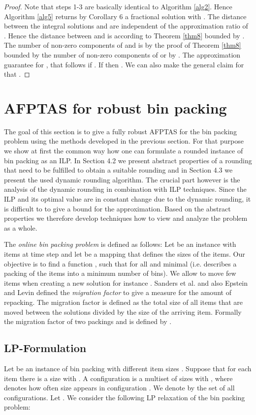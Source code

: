\documentclass[a4paper,11pt]{article}
\begin{document}
\begin{proof}
Note that steps 1-3 are basically identical to Algorithm \ref{alg2}. Hence Algorithm \ref{alg5} returns by Corollary 6 a fractional
solution  with . The distance between the integral solutions  
and  are independent of the approximation ratio of . Hence the distance between  and  is
according to Theorem \ref{thm8} bounded by . The number of non-zero components of
 and 
is by the proof of Theorem \ref{thm8} bounded by the number  of non-zero components of  or by 
.
The approximation guarantee for , that  follows if 
. If  then .
We can also make the general claim for  that .
\end{proof}

\section{AFPTAS for robust bin packing}
\label{sec:bin-packing}
The goal of this section is to give a fully robust AFPTAS for the bin packing
problem using the methods developed in the previous section. For that purpose we show at first the common way how one
can formulate a rounded instance of bin packing as an ILP. In Section 4.2 we present abstract properties
of a rounding that need to be fulfilled to obtain a suitable rounding and in Section 4.3 we present the used
dynamic rounding algorithm. The crucial part however is the analysis of the dynamic rounding in combination with ILP
techniques. Since the ILP and its optimal value are in constant change due to the dynamic rounding, it is difficult to 
to give a bound for the approximation. Based on the abstract properties we therefore develop techniques how
to view and analyze the problem as a whole. 

The \emph{online bin packing problem} is defined as follows:
Let  be an instance with  items at time step 
and let  be a mapping that defines the sizes of the items.
Our objective is to find a function , such that  for all
 and minimal  (i.e.  describes a packing of the items into a minimum number
of bins). We allow to move
few items when creating a new solution  for instance . 
Sanders et al. \cite{sanders2009} and also Epstein and Levin \cite{epstein2006robust}
defined the \emph{migration factor} to give a measure for the amount of repacking. 
The migration factor is defined as the total size of all items that are
moved between the solutions divided by the size of the arriving item.
Formally the migration factor of two packings  and  is defined by 
.
\subsection{LP-Formulation}
Let  be an instance of bin packing with  different item sizes . Suppose
that for each item  there is a size  with .
A configuration  is a multiset of sizes 
with , where 
denotes how often size  appears in configuration . We denote by  the set of all configurations. Let .
We consider the following LP relaxation of the bin packing problem:
\end{document}
